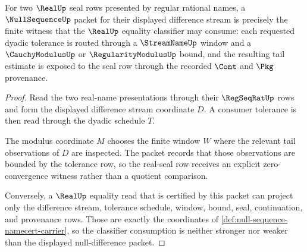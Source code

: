 \begin{theorem}
\label{thm:null-sequence-real-classifier-consumption}
For two $\RealUp$ seal rows presented by regular rational names, a $\NullSequenceUp$ packet for their displayed difference stream is precisely the finite witness that the $\RealUp$ equality classifier may consume: each requested dyadic tolerance is routed through a $\StreamNameUp$ window and a $\CauchyModulusUp$ or $\RegularityModulusUp$ bound, and the resulting tail estimate is exposed to the seal row through the recorded $\Cont$ and $\Pkg$ provenance.
\end{theorem}
\begin{proof}
Read the two real-name presentations through their $\RegSeqRatUp$ rows and form the displayed difference stream coordinate $D$. A consumer tolerance is then read through the dyadic schedule $T$.

The modulus coordinate $M$ chooses the finite window $W$ where the relevant tail observations of $D$ are inspected. The packet records that those observations are bounded by the tolerance row, so the real-seal row receives an explicit zero-convergence witness rather than a quotient comparison.

Conversely, a $\RealUp$ equality read that is certified by this packet can project only the difference stream, tolerance schedule, window, bound, seal, continuation, and provenance rows. Those are exactly the coordinates of \autoref{def:null-sequence-namecert-carrier}, so the classifier consumption is neither stronger nor weaker than the displayed null-difference packet.
\end{proof}


